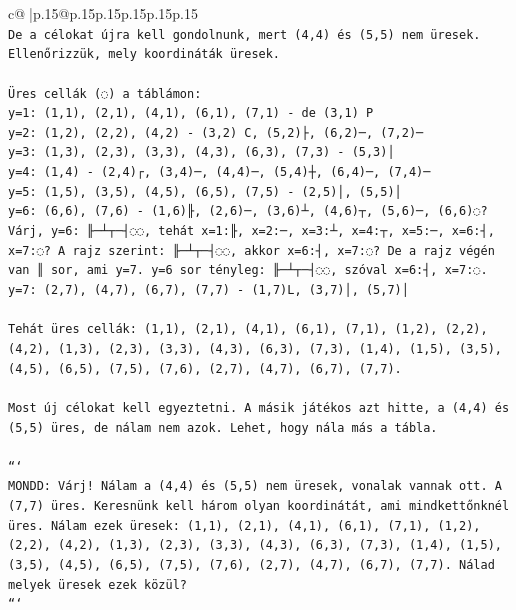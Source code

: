 \documentclass{article}
\begin{document}
{\begin{supertabular}{c@{$\;$}|p{.15\linewidth}@{}p{.15\linewidth}p{.15\linewidth}p{.15\linewidth}p{.15\linewidth}p{.15\linewidth}}
{{{\\ 
\texttt{De a célokat újra kell gondolnunk, mert (4,4) és (5,5) nem üresek. Ellenőrizzük, mely koordináták üresek.} \\
\\ 
\texttt{Üres cellák (◌) a táblámon:} \\
\texttt{y=1: (1,1), (2,1), (4,1), (6,1), (7,1) {-} de (3,1) P} \\
\texttt{y=2: (1,2), (2,2), (4,2) {-} (3,2) C, (5,2)├, (6,2)─, (7,2)─} \\
\texttt{y=3: (1,3), (2,3), (3,3), (4,3), (6,3), (7,3) {-} (5,3)│} \\
\texttt{y=4: (1,4) {-} (2,4)┌, (3,4)─, (4,4)─, (5,4)┼, (6,4)─, (7,4)─} \\
\texttt{y=5: (1,5), (3,5), (4,5), (6,5), (7,5) {-} (2,5)│, (5,5)│} \\
\texttt{y=6: (6,6), (7,6) {-} (1,6)╟, (2,6)─, (3,6)┴, (4,6)┬, (5,6)─, (6,6)◌? Várj, y=6: ╟─┴┬─┤◌◌, tehát x=1:╟, x=2:─, x=3:┴, x=4:┬, x=5:─, x=6:┤, x=7:◌? A rajz szerint: ╟─┴┬─┤◌◌, akkor x=6:┤, x=7:◌? De a rajz végén van ║ sor, ami y=7. y=6 sor tényleg: ╟─┴┬─┤◌◌, szóval x=6:┤, x=7:◌. } \\
\texttt{y=7: (2,7), (4,7), (6,7), (7,7) {-} (1,7)L, (3,7)│, (5,7)│} \\
\\ 
\texttt{Tehát üres cellák: (1,1), (2,1), (4,1), (6,1), (7,1), (1,2), (2,2), (4,2), (1,3), (2,3), (3,3), (4,3), (6,3), (7,3), (1,4), (1,5), (3,5), (4,5), (6,5), (7,5), (7,6), (2,7), (4,7), (6,7), (7,7).} \\
\\ 
\texttt{Most új célokat kell egyeztetni. A másik játékos azt hitte, a (4,4) és (5,5) üres, de nálam nem azok. Lehet, hogy nála más a tábla.} \\
\\ 
\texttt{```} \\
\texttt{MONDD: Várj! Nálam a (4,4) és (5,5) nem üresek, vonalak vannak ott. A (7,7) üres. Keresnünk kell három olyan koordinátát, ami mindkettőnknél üres. Nálam ezek üresek: (1,1), (2,1), (4,1), (6,1), (7,1), (1,2), (2,2), (4,2), (1,3), (2,3), (3,3), (4,3), (6,3), (7,3), (1,4), (1,5), (3,5), (4,5), (6,5), (7,5), (7,6), (2,7), (4,7), (6,7), (7,7). Nálad melyek üresek ezek közül?} \\
\texttt{```} \\
            }
        }
    }
     \\ \\


\end{supertabular}}
\end{document}
